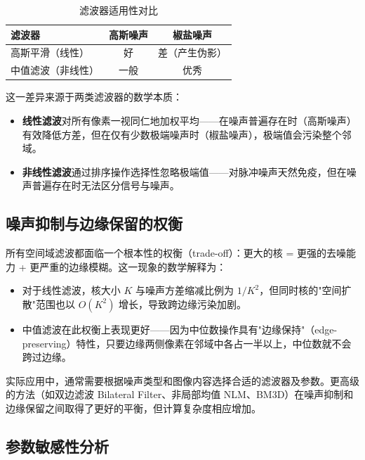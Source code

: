 \documentclass[12pt,a4paper]{ctexart}
\begin{document}
\begin{table}[H]
    \centering
    \caption{滤波器适用性对比}
    \begin{tabular}{lcc}
        \toprule
        \textbf{滤波器} & \textbf{高斯噪声} & \textbf{椒盐噪声} \\
        \midrule
        高斯平滑（线性） & 好 & 差（产生伪影） \\
        中值滤波（非线性） & 一般 & 优秀 \\
        \bottomrule
    \end{tabular}
\end{table}

这一差异来源于两类滤波器的数学本质：
\begin{itemize}[leftmargin=*]
    \item \textbf{线性滤波}对所有像素一视同仁地加权平均——在噪声普遍存在时（高斯噪声）有效降低方差，但在仅有少数极端噪声时（椒盐噪声），极端值会污染整个邻域。
    \item \textbf{非线性滤波}通过排序操作选择性忽略极端值——对脉冲噪声天然免疫，但在噪声普遍存在时无法区分信号与噪声。
\end{itemize}

\subsection{噪声抑制与边缘保留的权衡}

所有空间域滤波都面临一个根本性的权衡（trade-off）：更大的核 = 更强的去噪能力 + 更严重的边缘模糊。这一现象的数学解释为：

\begin{itemize}[leftmargin=*]
    \item 对于线性滤波，核大小 $K$ 与噪声方差缩减比例为 $1/K^2$，但同时核的"空间扩散"范围也以 $O(K^2)$ 增长，导致跨边缘污染加剧。
    \item 中值滤波在此权衡上表现更好——因为中位数操作具有"边缘保持"（edge-preserving）特性，只要边缘两侧像素在邻域中各占一半以上，中位数就不会跨过边缘。
\end{itemize}

实际应用中，通常需要根据噪声类型和图像内容选择合适的滤波器及参数。更高级的方法（如双边滤波 Bilateral Filter、非局部均值 NLM、BM3D）在噪声抑制和边缘保留之间取得了更好的平衡，但计算复杂度相应增加。

\subsection{参数敏感性分析}
\end{document}
